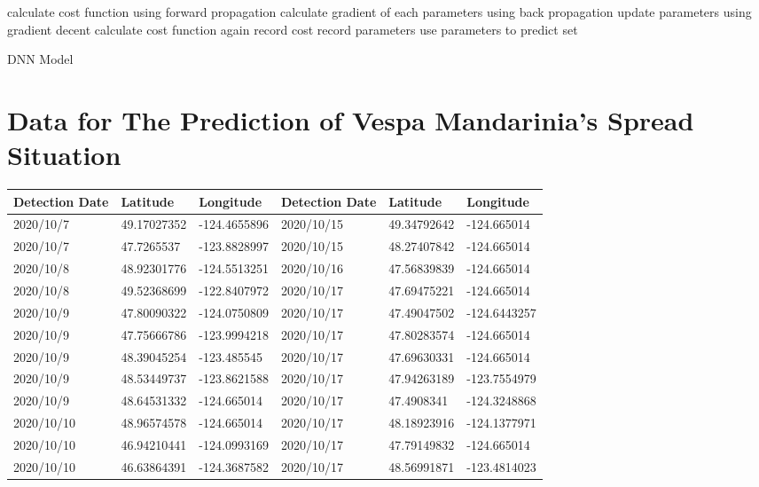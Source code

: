 \documentclass{mcmthesis}
\begin{document}
\begin{appendices}
\begin{algorithm}[H]
   {
        calculate cost function using forward propagation\;
        calculate gradient of each parameters using back propagation\;
        update parameters using gradient decent\;
        calculate cost function again\;
        record cost
  }
  record parameters\;
  use parameters to predict set\;
  \caption{DNN Model}
\end{algorithm}

\section{Data for The Prediction of Vespa Mandarinia's Spread Situation}
\begin{table}[htbp]
\centering
\begin{tabular}{|l|l|l|l|l|l|}
\hline
Detection Date & Latitude    & Longitude    & Detection Date & Latitude    & Longitude    \\ \hline
2020/10/7      & 49.17027352 & -124.4655896 & 2020/10/15     & 49.34792642 & -124.665014  \\ \hline
2020/10/7      & 47.7265537  & -123.8828997 & 2020/10/15     & 48.27407842 & -124.665014  \\ \hline
2020/10/8      & 48.92301776 & -124.5513251 & 2020/10/16     & 47.56839839 & -124.665014  \\ \hline
2020/10/8      & 49.52368699 & -122.8407972 & 2020/10/17     & 47.69475221 & -124.665014  \\ \hline
2020/10/9      & 47.80090322 & -124.0750809 & 2020/10/17     & 47.49047502 & -124.6443257 \\ \hline
2020/10/9      & 47.75666786 & -123.9994218 & 2020/10/17     & 47.80283574 & -124.665014  \\ \hline
2020/10/9      & 48.39045254 & -123.485545  & 2020/10/17     & 47.69630331 & -124.665014  \\ \hline
2020/10/9      & 48.53449737 & -123.8621588 & 2020/10/17     & 47.94263189 & -123.7554979 \\ \hline
2020/10/9      & 48.64531332 & -124.665014  & 2020/10/17     & 47.4908341  & -124.3248868 \\ \hline
2020/10/10     & 48.96574578 & -124.665014  & 2020/10/17     & 48.18923916 & -124.1377971 \\ \hline
2020/10/10     & 46.94210441 & -124.0993169 & 2020/10/17     & 47.79149832 & -124.665014  \\ \hline
2020/10/10     & 46.63864391 & -124.3687582 & 2020/10/17     & 48.56991871 & -123.4814023 \\ \hline

\end{tabular}
\end{table}
\end{appendices}
\end{document}
